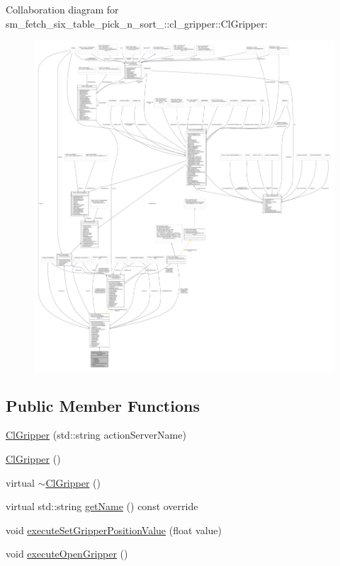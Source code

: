 Collaboration diagram for sm\+\_\+fetch\+\_\+six\+\_\+table\+\_\+pick\+\_\+n\+\_\+sort\+\_\+:\+:cl\+\_\+gripper\+:\+:Cl\+Gripper\+:
\nopagebreak
\begin{figure}[H]
\begin{center}
\leavevmode
\includegraphics[width=350pt]{classsm__fetch__six__table__pick__n__sort__1_1_1cl__gripper_1_1ClGripper__coll__graph}
\end{center}
\end{figure}
\subsection*{Public Member Functions}
\begin{DoxyCompactItemize}
\item 
\hyperlink{classsm__fetch__six__table__pick__n__sort__1_1_1cl__gripper_1_1ClGripper_a9d620ea0996e335d082592ad12bdaa82}{Cl\+Gripper} (std\+::string action\+Server\+Name)
\item 
\hyperlink{classsm__fetch__six__table__pick__n__sort__1_1_1cl__gripper_1_1ClGripper_ab07042c8ca9ded98610af1b766fd946f}{Cl\+Gripper} ()
\item 
virtual \hyperlink{classsm__fetch__six__table__pick__n__sort__1_1_1cl__gripper_1_1ClGripper_aa06005085b30fb56946c832f88dbd8ca}{$\sim$\+Cl\+Gripper} ()
\item 
virtual std\+::string \hyperlink{classsm__fetch__six__table__pick__n__sort__1_1_1cl__gripper_1_1ClGripper_a6da358b84df6a45b7ee6d71b8ef1fa50}{get\+Name} () const override
\item 
void \hyperlink{classsm__fetch__six__table__pick__n__sort__1_1_1cl__gripper_1_1ClGripper_a374dda699b33fc4470ed5f5f19178e2b}{execute\+Set\+Gripper\+Position\+Value} (float value)
\item 
void \hyperlink{classsm__fetch__six__table__pick__n__sort__1_1_1cl__gripper_1_1ClGripper_afa1184d1663a0a9adbb97fdc119f11da}{execute\+Open\+Gripper} ()
\end{DoxyCompactItemize}
